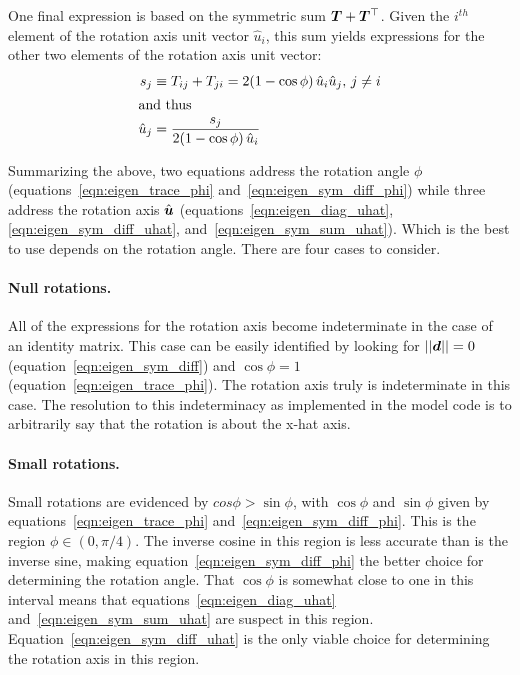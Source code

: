 One final expression is based on the symmetric sum $\boldsymbol{T} + {\boldsymbol{T}{^\top}}$.
Given the $i^{th}$ element of the rotation axis unit vector $\hat u_i$, this sum
yields expressions for the other two elements of the rotation axis unit vector:
\begin{align}
  \label{eqn:eigen_sym_sum}
  s_j &\equiv T_{ij}+T_{ji} = 2(1-\cos\phi)\,\hat u_i \hat u_j,\,j\ne i \\
  \intertext{and thus}
  \label{eqn:eigen_sym_sum_uhat}
  \hat u_j &= \frac{s_j}{2(1-\cos\phi)\,\hat u_i}
\end{align}

Summarizing the above, two equations address the rotation angle $\phi$
(equations~\eqref{eqn:eigen_trace_phi} and~\eqref{eqn:eigen_sym_diff_phi})
while three address the rotation axis $\hat{\boldsymbol{u}}$
(equations~\eqref{eqn:eigen_diag_uhat}, \eqref{eqn:eigen_sym_diff_uhat},
and~\eqref{eqn:eigen_sym_sum_uhat}). Which is the best to use depends on
the rotation angle. There are four cases to consider.

\paragraph{Null rotations.}
All of the expressions for the rotation axis become indeterminate in the case
of an identity matrix. This case can be easily identified by looking for
$||\boldsymbol{d}||=0$ (equation~\eqref{eqn:eigen_sym_diff}) and $\cos\phi = 1$
(equation~\eqref{eqn:eigen_trace_phi}).
The rotation axis truly is indeterminate in this case. The resolution to this
indeterminacy as implemented in the model code is to arbitrarily say that the
rotation is about the x-hat axis.

\paragraph{Small rotations.}
Small rotations are evidenced by $cos\phi > \sin\phi$, with $\cos\phi$ and
$\sin\phi$ given by equations~\eqref{eqn:eigen_trace_phi}
and~\eqref{eqn:eigen_sym_diff_phi}. This is the region $\phi\in(0,\pi/4)$.
The inverse cosine in this region is less accurate than is the inverse sine,
making equation~\eqref{eqn:eigen_sym_diff_phi} the better choice for determining
the rotation angle. That $\cos\phi$ is somewhat close to one in this interval
means that equations~\eqref{eqn:eigen_diag_uhat}
and~\eqref{eqn:eigen_sym_sum_uhat} are suspect in this region.
Equation~\eqref{eqn:eigen_sym_diff_uhat} is the only viable choice for
determining the rotation axis in this region.


